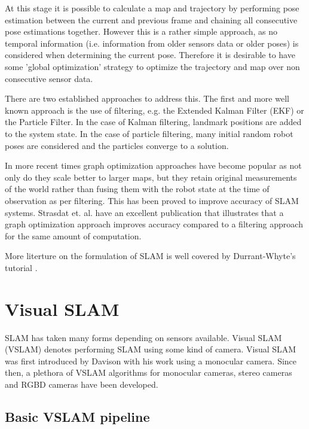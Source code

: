 At this stage it is possible to calculate a map and trajectory by performing pose estimation between the current and previous frame and chaining all consecutive pose estimations together.  However this is a rather simple approach, as no temporal information (i.e. information from older sensors data or older poses) is considered when determining the current pose.  Therefore it is desirable to have some 'global optimization' strategy to optimize the trajectory and map over non consecutive sensor data.

There are two established approaches to address this.  The first and more well known approach is the use of filtering, e.g. the Extended Kalman Filter (EKF)\cite{ekf} or the Particle Filter\cite{particle_filter}.  In the case of Kalman filtering, landmark positions are added to the system state.  In the case of particle filtering, many initial random robot poses are considered and the particles converge to a solution.

In more recent times graph optimization approaches have become popular as not only do they scale better to larger maps, but they retain original measurements of the world rather than fusing them with the robot state at the time of observation as per filtering.  This has been proved to improve accuracy of SLAM systems. Strasdat et. al.\cite{why_filter} have an excellent publication that illustrates that a graph optimization approach improves accuracy compared to a filtering approach for the same amount of computation.

More literture on the formulation of SLAM is well covered by Durrant-Whyte's tutorial\cite{slam_1} \cite{slam_2}.

\section{Visual SLAM}

SLAM has taken many forms depending on sensors available. Visual SLAM (VSLAM) denotes performing SLAM using some kind of camera.  Visual SLAM was first introduced by Davison with his work using a monocular camera\cite{davison_03}.  Since then, a plethora of VSLAM algorithms for monocular cameras\cite{davison_04}\cite{ptam}\cite{dtam}, stereo cameras \cite{mei_09}\cite{paz_08}\cite{rslam}\cite{particle_slam}\cite{strasdat_11} and RGBD cameras \cite{rgbdslam}\cite{kinfu}\cite{kintinuous} have been developed.

\subsection{Basic VSLAM pipeline}

